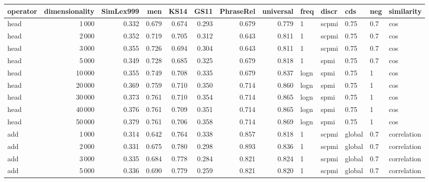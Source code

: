 \begin{tabular}{lrrrrrrrlllll}
\toprule
operator &  dimensionality &  SimLex999 &    men &   KS14 &   GS11 &  PhraseRel &  universal &  freq &  discr &     cds &  neg &     similarity \\
\midrule
    head &            1\,000 &      0.332 &  0.679 &  0.674 &  0.293 &      0.679 &      0.779 &     1 &  scpmi &    0.75 &  0.7 &            cos \\
    head &            2\,000 &      0.352 &  0.719 &  0.705 &  0.312 &      0.643 &      0.811 &     1 &  scpmi &    0.75 &  0.7 &            cos \\
    head &            3\,000 &      0.355 &  0.726 &  0.694 &  0.304 &      0.643 &      0.811 &     1 &  scpmi &    0.75 &  0.7 &            cos \\
    head &            5\,000 &      0.349 &  0.728 &  0.685 &  0.325 &      0.679 &      0.818 &     1 &   spmi &    0.75 &  0.7 &            cos \\
    head &           10\,000 &      0.355 &  0.749 &  0.708 &  0.335 &      0.679 &      0.837 &  logn &   spmi &    0.75 &    1 &            cos \\
    head &           20\,000 &      0.369 &  0.759 &  0.710 &  0.350 &      0.714 &      0.860 &  logn &   spmi &    0.75 &    1 &            cos \\
    head &           30\,000 &      0.373 &  0.761 &  0.710 &  0.354 &      0.714 &      0.865 &  logn &   spmi &    0.75 &    1 &            cos \\
    head &           40\,000 &      0.376 &  0.761 &  0.709 &  0.351 &      0.714 &      0.865 &  logn &   spmi &    0.75 &    1 &            cos \\
    head &           50\,000 &      0.379 &  0.761 &  0.706 &  0.358 &      0.714 &      0.869 &  logn &   spmi &    0.75 &    1 &            cos \\
     add &            1\,000 &      0.314 &  0.642 &  0.764 &  0.338 &      0.857 &      0.818 &     1 &  scpmi &  global &  0.7 &    correlation \\
     add &            2\,000 &      0.331 &  0.675 &  0.780 &  0.298 &      0.893 &      0.836 &     1 &  scpmi &  global &  0.7 &    correlation \\
     add &            3\,000 &      0.335 &  0.684 &  0.778 &  0.284 &      0.821 &      0.824 &     1 &  scpmi &  global &  0.7 &    correlation \\
     add &            5\,000 &      0.336 &  0.690 &  0.779 &  0.259 &      0.821 &      0.820 &     1 &  scpmi &  global &  0.7 &    correlation \\

\end{tabular}

